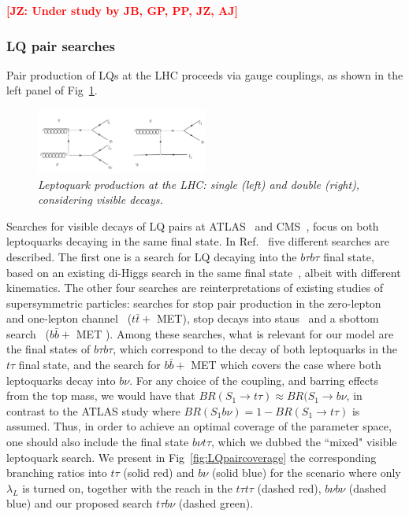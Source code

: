 \documentclass[11pt]{cernrep}
\def\JZ#1{{\bf  \textcolor{red}{[JZ: {#1}]}}}
\begin{document}
\JZ{Under study by JB, GP, PP, JZ, AJ}

\subsubsection{LQ pair searches}

Pair production of LQs at the LHC proceeds via gauge couplings, as shown in the left panel of Fig~\ref{fig:LQvisible}.

 \begin{figure}[!htp]
  \centering
  \includegraphics[width=0.5\textwidth]{./figures/LQ_visible.png} 
  \caption{\it Leptoquark production at the LHC: single (left) and double (right), considering visible decays.}
\label{fig:LQvisible}
\end{figure}
Searches for visible decays of LQ pairs at ATLAS~\cite{Aad:2015caa,Aaboud:2019jcc,Aaboud:2019bye} and CMS~\cite{Sirunyan:2018nkj,Sirunyan:2018kzh,Sirunyan:2018vhk}, focus on both leptoquarks decaying in the same final state. In Ref.~\cite{Aaboud:2019bye} five different searches are described. The first one is a search for LQ decaying into the $b \tau b \tau$ final state, based on an existing di-Higgs search in the same final state~\cite{Aaboud:2018sfw}, albeit with different kinematics. The other four searches are reinterpretations of existing studies of supersymmetric particles: searches for stop pair production in the zero-lepton~\cite{Aaboud:2017ayj} and one-lepton channel~\cite{Aaboud:2017aeu} ($t \bar{t} +$ MET), stop decays into staus~\cite{Aaboud:2018kya} and a sbottom search~\cite{Aaboud:2017wqg} ($b\bar{b} + $ MET ). Among these searches, what is relevant for our model are the final states of $b \tau b \tau$, which correspond to the decay of both leptoquarks in the $t \tau$ final state, and the search for $b \bar{b} +$ MET  which covers the case where both leptoquarks decay into $b \nu$. For any choice of the coupling, and barring effects from the top mass, we would have that $BR (S_1 \to t \tau) \approx BR (S_1 \to b \nu$, in contrast to the ATLAS study where $BR(S_1 b \nu) = 1 - BR(S_1 \to t \tau)$ is assumed. Thus, in order to achieve an optimal coverage of the parameter space, one should also include the final state $b \nu t \tau$, which we dubbed the ``mixed" visible leptoquark search. We present in Fig~\ref{fig:LQpaircoverage} the corresponding branching ratios into $t \tau$ (solid red) and $b \nu$ (solid blue) for the scenario where only $\lambda_L$ is turned on, together with the reach in the $t \tau t \tau$ (dashed red), $b \nu b \nu$ (dashed blue) and our proposed search $t \tau b \nu$ (dashed green).
\end{document}
